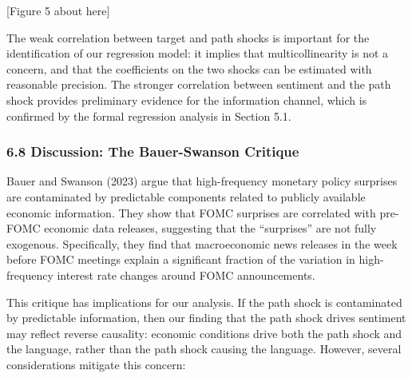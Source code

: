 \documentclass[
]{article}
\begin{document}
{[}Figure 5 about here{]}

The weak correlation between target and path shocks is important for the
identification of our regression model: it implies that
multicollinearity is not a concern, and that the coefficients on the two
shocks can be estimated with reasonable precision. The stronger
correlation between sentiment and the path shock provides preliminary
evidence for the information channel, which is confirmed by the formal
regression analysis in Section 5.1.

\subsubsection{6.8 Discussion: The Bauer-Swanson
Critique}\label{discussion-the-bauer-swanson-critique}

Bauer and Swanson (2023) argue that high-frequency monetary policy
surprises are contaminated by predictable components related to publicly
available economic information. They show that FOMC surprises are
correlated with pre-FOMC economic data releases, suggesting that the
``surprises'' are not fully exogenous. Specifically, they find that
macroeconomic news releases in the week before FOMC meetings explain a
significant fraction of the variation in high-frequency interest rate
changes around FOMC announcements.

This critique has implications for our analysis. If the path shock is
contaminated by predictable information, then our finding that the path
shock drives sentiment may reflect reverse causality: economic
conditions drive both the path shock and the language, rather than the
path shock causing the language. However, several considerations
mitigate this concern:
\end{document}

